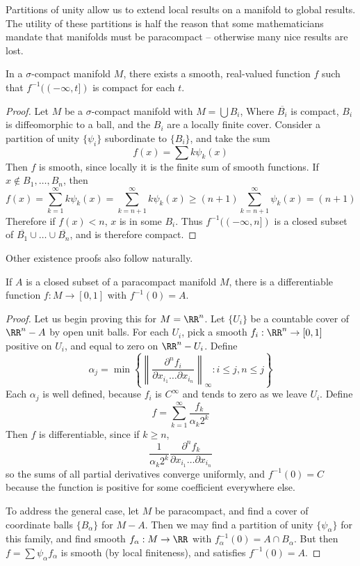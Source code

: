 Partitions of unity allow us to extend local results on a manifold to global results. The utility of these partitions is half the reason that some mathematicians mandate that manifolds must be paracompact -- otherwise many nice results are lost.

\begin{theorem}
    In a $\sigma$-compact manifold $M$, there exists a smooth, real-valued function $f$ such that $f^{-1}((-\infty, t])$ is compact for each $t$.
\end{theorem}
\begin{proof}
    Let $M$ be a $\sigma$-compact manifold with $M = \bigcup B_i$, Where $\overline{B_i}$ is compact, $B_i$ is diffeomorphic to a ball, and the $B_i$ are a locally finite cover. Consider a partition of unity $\{\psi_i\}$ subordinate to $\{B_i\}$, and take the sum
    \[ f(x) = \sum k \psi_k(x) \]
    Then $f$ is smooth, since locally it is the finite sum of smooth functions. If $x \not \in B_1, \dots, B_n$, then
    \[ f(x) = \sum_{k = 1}^\infty k \psi_k(x) = \sum_{k = n+1}^\infty k \psi_k(x) \geq (n+1) \sum_{k = n+1}^\infty \psi_k(x) = (n+1) \]
    Therefore if $f(x) < n$, $x$ is in some $B_i$. Thus $f^{-1}((-\infty, n])$ is a closed subset of $\overline{B_1} \cup \dots \cup \overline{B_n}$, and is therefore compact.
\end{proof}

Other existence proofs also follow naturally.

\begin{lemma}
    If $A$ is a closed subset of a paracompact manifold $M$, there is a differentiable function $f: M \to [0,1]$ with $f^{-1}(0) = A$.
\end{lemma}
\begin{proof}
    Let us begin proving this for $M = \RR^n$. Let $\{ U_i \}$ be a countable cover of $\RR^n - A$ by open unit balls. For each $U_i$, pick a smooth $f_i : \RR^n \to [0,1]$ positive on $U_i$, and equal to zero on $\RR^n - U_i$. Define
    \[ \alpha_j = \min \left\{ \left\| \frac{\partial^n f_i}{\partial x_{i_1} \dots \partial x_{i_n}} \right\|_\infty : i \leq j, n \leq j \right\} \]
    Each $\alpha_j$ is well defined, because $f_i$ is $C^\infty$ and tends to zero as we leave $U_i$. Define
    \[ f = \sum_{k = 1}^\infty \frac{f_k}{\alpha_k 2^k} \]
    Then $f$ is differentiable, since if $k \geq n$,
    \[ \frac{1}{\alpha_k 2^k} \frac{\partial^n f_k}{\partial x_{i_1} \dots \partial x_{i_n}} \]
    so the sums of all partial derivatives converge uniformly, and $f^{-1}(0) = C$ because the function is positive for some coefficient everywhere else.

    To address the general case, let $M$ be paracompact, and find a cover of coordinate balls $\{ B_\alpha \}$ for $M - A$. Then we may find a partition of unity $\{ \psi_\alpha \}$ for this family, and find smooth $f_\alpha: M \to \RR$ with $f_\alpha^{-1}(0) = A \cap B_\alpha$. But then $f = \sum \psi_\alpha f_\alpha$ is smooth (by local finiteness), and satisfies $f^{-1}(0) = A$.
\end{proof}

